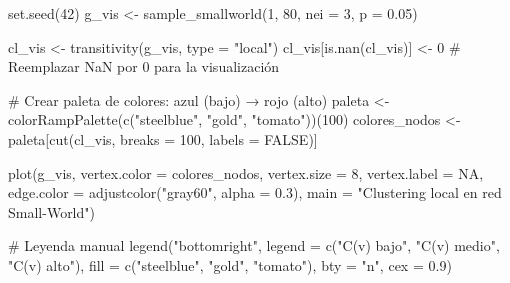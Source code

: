 \documentclass[
  letterpaper,
  DIV=11,
  numbers=noendperiod]{scrreprt}
\newenvironment{Shaded}{\begin{snugshade}}{\end{snugshade}}
\newcommand{\AttributeTok}[1]{\textcolor[rgb]{0.40,0.45,0.13}{#1}}
\newcommand{\CommentTok}[1]{\textcolor[rgb]{0.37,0.37,0.37}{#1}}
\newcommand{\ConstantTok}[1]{\textcolor[rgb]{0.56,0.35,0.01}{#1}}
\newcommand{\DecValTok}[1]{\textcolor[rgb]{0.68,0.00,0.00}{#1}}
\newcommand{\FloatTok}[1]{\textcolor[rgb]{0.68,0.00,0.00}{#1}}
\newcommand{\FunctionTok}[1]{\textcolor[rgb]{0.28,0.35,0.67}{#1}}
\newcommand{\NormalTok}[1]{\textcolor[rgb]{0.00,0.23,0.31}{#1}}
\newcommand{\OtherTok}[1]{\textcolor[rgb]{0.00,0.23,0.31}{#1}}
\newcommand{\StringTok}[1]{\textcolor[rgb]{0.13,0.47,0.30}{#1}}
\begin{document}
\begin{Shaded}
\begin{Highlighting}[]
\FunctionTok{set.seed}\NormalTok{(}\DecValTok{42}\NormalTok{)}
\NormalTok{g\_vis }\OtherTok{\textless{}{-}} \FunctionTok{sample\_smallworld}\NormalTok{(}\DecValTok{1}\NormalTok{, }\DecValTok{80}\NormalTok{, }\AttributeTok{nei =} \DecValTok{3}\NormalTok{, }\AttributeTok{p =} \FloatTok{0.05}\NormalTok{)}

\NormalTok{cl\_vis }\OtherTok{\textless{}{-}} \FunctionTok{transitivity}\NormalTok{(g\_vis, }\AttributeTok{type =} \StringTok{"local"}\NormalTok{)}
\NormalTok{cl\_vis[}\FunctionTok{is.nan}\NormalTok{(cl\_vis)] }\OtherTok{\textless{}{-}} \DecValTok{0}  \CommentTok{\# Reemplazar NaN por 0 para la visualización}

\CommentTok{\# Crear paleta de colores: azul (bajo) → rojo (alto)}
\NormalTok{paleta }\OtherTok{\textless{}{-}} \FunctionTok{colorRampPalette}\NormalTok{(}\FunctionTok{c}\NormalTok{(}\StringTok{"steelblue"}\NormalTok{, }\StringTok{"gold"}\NormalTok{, }\StringTok{"tomato"}\NormalTok{))(}\DecValTok{100}\NormalTok{)}
\NormalTok{colores\_nodos }\OtherTok{\textless{}{-}}\NormalTok{ paleta[}\FunctionTok{cut}\NormalTok{(cl\_vis, }\AttributeTok{breaks =} \DecValTok{100}\NormalTok{, }\AttributeTok{labels =} \ConstantTok{FALSE}\NormalTok{)]}

\FunctionTok{plot}\NormalTok{(g\_vis,}
     \AttributeTok{vertex.color =}\NormalTok{ colores\_nodos,}
     \AttributeTok{vertex.size =} \DecValTok{8}\NormalTok{,}
     \AttributeTok{vertex.label =} \ConstantTok{NA}\NormalTok{,}
     \AttributeTok{edge.color =} \FunctionTok{adjustcolor}\NormalTok{(}\StringTok{"gray60"}\NormalTok{, }\AttributeTok{alpha =} \FloatTok{0.3}\NormalTok{),}
     \AttributeTok{main =} \StringTok{"Clustering local en red Small{-}World"}\NormalTok{)}

\CommentTok{\# Leyenda manual}
\FunctionTok{legend}\NormalTok{(}\StringTok{"bottomright"}\NormalTok{,}
       \AttributeTok{legend =} \FunctionTok{c}\NormalTok{(}\StringTok{"C(v) bajo"}\NormalTok{, }\StringTok{"C(v) medio"}\NormalTok{, }\StringTok{"C(v) alto"}\NormalTok{),}
       \AttributeTok{fill =} \FunctionTok{c}\NormalTok{(}\StringTok{"steelblue"}\NormalTok{, }\StringTok{"gold"}\NormalTok{, }\StringTok{"tomato"}\NormalTok{),}
       \AttributeTok{bty =} \StringTok{"n"}\NormalTok{, }\AttributeTok{cex =} \FloatTok{0.9}\NormalTok{)}
\end{Highlighting}
\end{Shaded}
\end{document}
